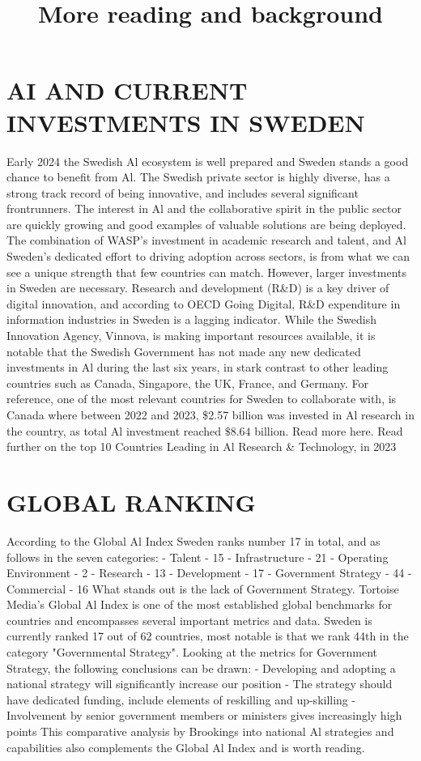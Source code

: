 \section*{AI AND CURRENT INVESTMENTS IN SWEDEN}
Early 2024 the Swedish Al ecosystem is well prepared and Sweden stands a good chance to benefit from Al. The Swedish private sector is highly diverse, has a strong track record of being innovative, and includes several significant frontrunners. The interest in Al and the collaborative spirit in the public sector are quickly growing and good examples of valuable solutions are being deployed. The combination of WASP's investment in academic research and talent, and Al Sweden's dedicated effort to driving adoption across sectors, is from what we can see a unique strength that few countries can match.
However, larger investments in Sweden are necessary. Research and development (R\&D) is a key driver of digital innovation, and according to OECD Going Digital, R\&D expenditure in information industries in Sweden is a lagging indicator.
While the Swedish Innovation Agency, Vinnova, is making important resources available, it is notable that the Swedish Government has not made any new dedicated investments in Al during the last six years, in stark contrast to other leading countries such as Canada, Singapore, the UK, France, and Germany.
For reference, one of the most relevant countries for Sweden to collaborate with, is Canada where between 2022 and 2023, \$2.57 billion was invested in Al research in the country, as total Al investment reached \(\$ 8.64\) billion. Read more here.
Read further on the top 10 Countries Leading in Al Research \& Technology, in 2023

\title{
More reading and background
}
\section*{GLOBAL RANKING}
According to the Global Al Index Sweden ranks number 17 in total, and as follows in the seven categories:
- Talent - 15
- Infrastructure - 21
- Operating Environment - 2
- Research - 13
- Development - 17
- Government Strategy - 44
- Commercial - 16
What stands out is the lack of Government Strategy.
Tortoise Media's Global Al Index is one of the most established global benchmarks for countries and encompasses several important metrics and data.
Sweden is currently ranked 17 out of 62 countries, most notable is that we rank 44th in the category "Governmental Strategy". Looking at the metrics for Government Strategy, the following conclusions can be drawn:
- Developing and adopting a national strategy will significantly increase our position
- The strategy should have dedicated funding, include elements of reskilling and up-skilling
- Involvement by senior government members or ministers gives increasingly high points
This comparative analysis by Brookings into national Al strategies and capabilities also complements the Global Al Index and is worth reading.

